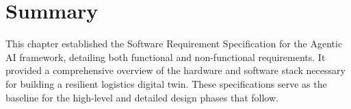 \section[Summary]{Summary}
This chapter established the Software Requirement Specification for the Agentic AI framework, detailing both functional and non-functional requirements. It provided a comprehensive overview of the hardware and software stack necessary for building a resilient logistics digital twin. These specifications serve as the baseline for the high-level and detailed design phases that follow.







